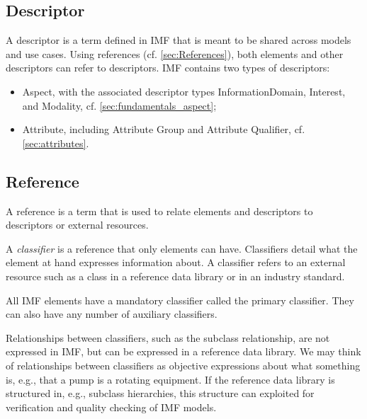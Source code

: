 \documentclass[../main.tex]{subfiles}
\begin{document}
\subsection{Descriptor}
\label{sec:Descriptor}
A descriptor is a term defined in IMF that is meant to be shared across models and use cases. Using references (cf. \autoref{sec:References}), both elements and other descriptors can refer to descriptors. IMF contains two types of descriptors:
\begin{itemize}
    \item Aspect, with the associated descriptor types  InformationDomain, Interest, and Modality, cf. \autoref{sec:fundamentals_aspect};
    \item Attribute, including Attribute Group and Attribute Qualifier, cf. \autoref{sec:attributes}.
\end{itemize}


\subsection{Reference}
\label{sec:References}
A reference is a term that is used to relate elements and descriptors to descriptors or external resources. %

A \textit{classifier} is a reference that only elements can have. Classifiers detail  what the element at hand expresses information about. A classifier refers to an external resource such as a class in a reference data library or in an industry standard. 

All IMF elements have a mandatory classifier called the primary classifier.  They can also have any number of auxiliary classifiers. 



Relationships between classifiers, such as the subclass relationship, are not expressed in IMF, but can be expressed in a reference data library. We may think of  relationships between classifiers as objective expressions about what something is, e.g., that a pump is a rotating equipment. If the reference data library is  structured in, e.g., subclass hierarchies, this structure can exploited  for verification and quality checking of  IMF models. 
\end{document}
